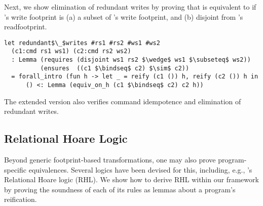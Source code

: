\documentclass[sigplan,screen]{acmart}\settopmatter{}
\newcommand\citepos[1]{\citeauthor{#1}'s\ \citeyear{#1}}
\begin{document}
\iffull

Next, we show elimination of redundant writes by proving that 
is equivalent to  if 's write footprint is \iffull (a) \fi a
subset of 's write footprint, and \iffull (b) \fi disjoint from 's
read\iffull footprint\fi.

\begin{lstlisting}
let redundant$\_$writes #rs1 #rs2 #ws1 #ws2 
  (c1:cmd rs1 ws1) (c2:cmd rs2 ws2)
  : Lemma (requires (disjoint ws1 rs2 $\wedge$ ws1 $\subseteq$ ws2))
          (ensures  ((c1 $\bindseq$ c2) $\sim$ c2))
  = forall_intro (fun h -> let _ = reify (c1 ()) h, reify (c2 ()) h in 
      () <: Lemma (equiv_on_h (c1 $\bindseq$ c2) c2 h))
\end{lstlisting}

\else
The extended version \cite{relational} also verifies command idempotence and
elimination of redundant writes.

\fi




\subsection{Relational Hoare Logic}
\label{sec:benton2004-rhl}

Beyond generic footprint-based transformations, one may also prove
program-specific equivalences. Several logics have been devised for
this, including,
e.g., \citepos{benton04relational} Relational Hoare logic (RHL). We
show how to derive RHL within our framework by proving the soundness
of each of its rules as lemmas about a program's reification.
\end{document}
